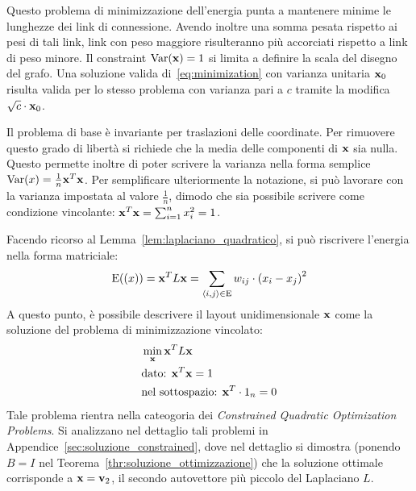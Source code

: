 \documentclass[10pt,a4paper]{article}
\newcommand{\Var}{\mathrm{Var}}
\newcommand{\E}{\mathrm{E}}
\begin{document}
Questo problema di minimizzazione dell'energia punta a mantenere minime le lunghezze dei link di connessione.
Avendo inoltre una somma pesata rispetto ai pesi di tali link, link con peso maggiore risulteranno più accorciati rispetto a link di peso minore.
Il constraint \(\Var(\vb{x}) = 1\) si limita a definire la scala del disegno del grafo. Una soluzione valida di~\eqref{eq:minimization} con varianza unitaria \(\vb{x}_0\) risulta valida per lo stesso problema con varianza pari a \(c\) tramite la modifica \(\sqrt{c}\cdot\vb{x}_0\).

Il problema di base è invariante per traslazioni delle coordinate.
Per rimuovere questo grado di libertà si richiede che la media delle componenti di \(\vb{x}\) sia nulla.
Questo permette inoltre di poter scrivere la varianza nella forma semplice \(\Var(x) = \frac{1}{n}\vb{x}^T\vb{x}\).
Per semplificare ulteriormente la notazione, si può lavorare con la varianza impostata al valore \(\frac{1}{n}\), dimodo che sia possibile scrivere come condizione vincolante: \(\vb{x}^T\vb{x} = \sum_{i=1}^n x_i^2 = 1\).

Facendo ricorso al Lemma~\ref{lem:laplaciano_quadratico}, si può riscrivere l'energia nella forma matriciale:
\begin{equation}
    \E(\vb(x)) = \vb{x}^T L\vb{x} = \sum_{\langle i,j\rangle\in \E} w_{ij}\cdot {(x_i - x_j)}^2
\end{equation}
A questo punto, è possibile descrivere il layout unidimensionale \(\vb{x}\) come la soluzione del problema di minimizzazione vincolato:
\begin{align}
    & \min_{\vb{x}} \vb{x}^T L\vb{x}\\
    & \text{dato: } \vb{x}^T\vb{x} = 1 \\
    & \text{nel sottospazio: } \vb{x}^T \cdot 1_n = 0
\end{align}
Tale problema rientra nella cateogoria dei \textit{Constrained Quadratic Optimization Problems}.
Si analizzano nel dettaglio tali problemi in Appendice~\ref{sec:soluzione_constrained}, dove nel dettaglio si dimostra (ponendo \(B=I\) nel Teorema~\ref{thr:soluzione_ottimizzazione}) che la soluzione ottimale corrisponde a \(\vb{x} = \vb{v}_2\), il secondo autovettore più piccolo del Laplaciano \(L\).
\end{document}
